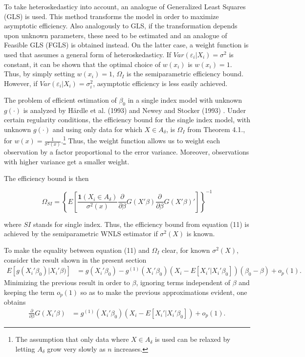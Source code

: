 To take heteroskedasticy into account, an analogue of Generalized Least Squares (GLS) is used. This method transforms the model in order to maximize asymptotic efficiency. Also analogously to GLS, if the transformation depends upon unknown parameters, these need to be estimated and an analogue of Feasible GLS (FGLS) is obtained instead. On the latter case, a weight function is used that assumes a general form of heteroskedasticy.
If $Var(\varepsilon_i|X_i) = \sigma^2$ is constant, it can be shown that the optimal choice of $w(x_i)$ is $w(x_i)=1$. Thus, by simply setting $w(x_i)=1$, $\Omega_I$ is the semiparametric efficiency bound. However, if $Var(\varepsilon_i|X_i) = \sigma_i^2$, asymptotic efficiency is less easily achieved.  

The problem of efficient estimation of $\beta_0$ in a single index model with unknown $g(\cdot)$ is analyzed by H{\"a}rdle et al. (1993) \cite{[18]} and Newey and Stocker (1993) \cite{[19]}. Under certain regularity conditions, the efficiency bound for the single index model, with unknown $g(\cdot)$ and using only data for which $X \in A_{\delta}$, is $\Omega_I$ from Theorem 4.1., for $w(x) = \frac{1}{\sigma^2(x)}$.\footnote{The assumption that only data where  $X \in A_{\delta}$ is used can be relaxed by letting $A_\delta$ grow very slowly as $n$ increases.} Thus, the weight function allows us to weight each observation by a factor proportional to the error variance. Moreover, observations with higher variance get a smaller weight. 

The efficiency bound is then

\begin{equation}
\Omega_{SI} = \left\{ E\left[\frac{\mathbf{1}{(X_i \in A_\delta)}}{\sigma^2(x)}\frac{\partial}{\partial \beta}
 G(X'\beta)\frac{\partial}{\partial \beta} G(X'\beta)' \right] \right\}^{-1}
\end{equation}

where $SI$ stands for single index. Thus, the efficiency bound from equation (11) is achieved by the semiparametric WNLS estimator if $\sigma^2(X)$ is known.

To make the equality between equation (11) and $\Omega_I$ clear, for known $\sigma^2(X)$, consider the result shown in the present section
\begin{align*}
E[g(X_i'\beta_0)|X_i'\beta)] & = g(X_i'\beta_0) - g^{(1)}(X_i'\beta_0)( X_i - E[X_i'|X_i'\beta_0])(\beta_0 - \beta) + o_p(1).                                          
\end{align*}
Minimizing the previous result in order to $\beta$, ignoring terms independent of $\beta$ and keeping the term $o_p(1)$ so as to make the previous approximations evident, one obtains
\begin{align*}
 \frac{\partial}{\partial \beta} G(X_i'\beta) & = g^{(1)}(X_i'\beta_0)( X_i - E[X_i'|X_i'\beta_0]) + o_p(1).
\end{align*}

